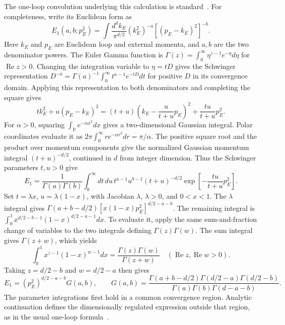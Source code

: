 The one-loop convolution underlying this calculation is standard~\cite{Grozin2004Banana}.
For completeness, write its Euclidean form as
\begin{equation}
 E_1(a,b;p_E^2)=\int\frac{d^d k_E}{\pi^{d/2}}
                 (k_E^2)^{-a}[(p_E-k_E)^2]^{-b}.
\end{equation}
Here $k_E$ and $p_E$ are Euclidean loop and external momenta, and $a,b$
are the two denominator powers. The Euler Gamma function is
$\Gamma(z)=\int_0^\infty \eta^{z-1}e^{-\eta}d\eta$ for $\operatorname{Re}z>0$.
Changing the integration variable to $\eta=tD$ gives the Schwinger
representation $D^{-a}=\Gamma(a)^{-1}\int_0^\infty t^{a-1}e^{-tD}dt$
for positive $D$ in its convergence domain. Applying this representation
to both denominators and completing the square gives
\begin{equation}
 t k_E^2+u(p_E-k_E)^2
 =(t+u)\left(k_E-\frac{u}{t+u}p_E\right)^2
  +\frac{tu}{t+u}p_E^2.
\end{equation}
For $\alpha>0$, squaring $\int_{\mathbb R}e^{-\alpha x^2}dx$ gives
a two-dimensional Gaussian integral. Polar coordinates evaluate it as
$2\pi\int_0^\infty r e^{-\alpha r^2}dr=\pi/\alpha$.
The positive square root and the product over momentum components give
the normalized Gaussian momentum integral $(t+u)^{-d/2}$, continued in
$d$ from integer dimension. Thus the Schwinger parameters $t,u>0$ give
\begin{equation}
 E_1=\frac{1}{\Gamma(a)\Gamma(b)}
 \int_0^\infty dt\,du\,
 t^{a-1}u^{b-1}(t+u)^{-d/2}
 \exp\left[-\frac{tu}{t+u}p_E^2\right].
\end{equation}
Set $t=\lambda x$, $u=\lambda(1-x)$, with Jacobian $\lambda$,
$\lambda>0$, and $0<x<1$. The $\lambda$ integral gives
$\Gamma(a+b-d/2)[x(1-x)p_E^2]^{d/2-a-b}$. The remaining integral is
$\int_0^1 x^{d/2-b-1}(1-x)^{d/2-a-1}dx$. To evaluate it, apply the same
sum-and-fraction change of variables to the two integrals defining
$\Gamma(z)\Gamma(w)$. The sum integral gives $\Gamma(z+w)$, which yields
\begin{equation}
 \int_0^1 x^{z-1}(1-x)^{w-1}dx
 =\frac{\Gamma(z)\Gamma(w)}{\Gamma(z+w)}
 \quad (\operatorname{Re}z,\operatorname{Re}w>0).
\end{equation}
Taking $z=d/2-b$ and $w=d/2-a$ then gives
\begin{equation}
 E_1=(p_E^2)^{d/2-a-b}G(a,b),\qquad
 G(a,b)=\frac{\Gamma(a+b-d/2)\Gamma(d/2-a)\Gamma(d/2-b)}
 {\Gamma(a)\Gamma(b)\Gamma(d-a-b)}.
 \label{eq:banana-convolution}
\end{equation}
The parameter integrations first hold in a common convergence region.
Analytic continuation defines the dimensionally regulated expression
outside that region, as in the usual one-loop formula~\cite{Grozin2004Banana}.

